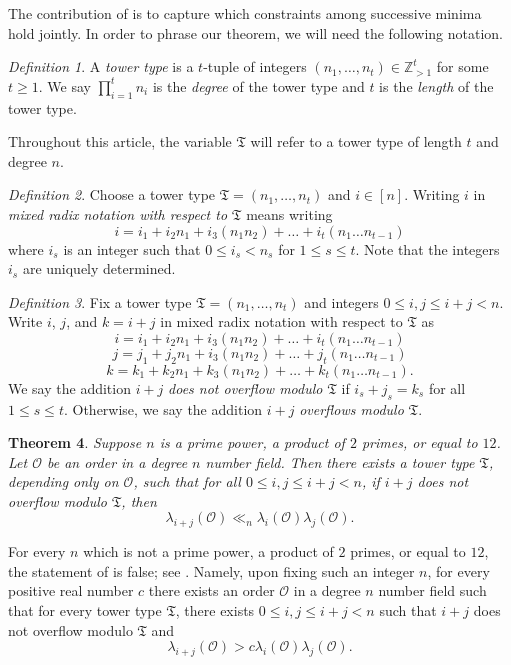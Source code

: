 \documentclass[letterpaper,10pt]{amsart}
\newcommand{\ZZ}{\mathbb{Z}}      %
\newcommand{\cO}{\mathcal{O}}      %
\newcommand{\mfT}{\mathfrak{T}}
\newtheorem{theorem}{Theorem}[section]
\theoremstyle{definition}
\theoremstyle{remark}
\newtheorem{definition}[theorem]{Definition}
\begin{document}
The contribution of  is to capture which constraints among successive minima hold jointly. In order to phrase our theorem, we will need the following notation.

\begin{definition}
\label{def:tower-type}
A \emph{tower type} is a $t$-tuple of integers $(n_1,\dots,n_t) \in \ZZ_{>1}^t$ for some $t \geq 1$. We say $\prod_{i = 1}^tn_i$ is the \emph{degree} of the tower type and $t$ is the \emph{length} of the tower type. 
\end{definition}

\noindent Throughout this article, the variable $\mfT$ will refer to a tower type of length $t$ and degree $n$. 

\begin{definition}
\label{def:mixed-radix}
Choose a tower type $\mfT = (n_1,\dots,n_t)$ and $i \in [n]$. Writing $i$ in \emph{mixed radix notation with respect to $\mfT$} means writing
\[
	i = i_1 + i_2 n_1 + i_3 (n_1n_2) + \dots + i_t(n_1\dots n_{t-1})
\]
where $i_s$ is an integer such that $0 \leq i_s < n_s$ for $1\leq s \leq t$. Note that the integers $i_s$ are uniquely determined.
\end{definition}

\begin{definition}
\label{def:overflow}
Fix a tower type $\mfT=(n_1,\dots,n_t)$ and integers $0 \leq i, j \leq i + j < n$. Write $i$, $j$, and $k=i+j$ in mixed radix notation with respect to $\mfT$ as 
\[
	i = i_1 + i_2 n_1 + i_3 (n_1n_2) + \dots + i_t(n_1\dots n_{t-1})
\]
\[
	j = j_1 + j_2 n_1 + i_3 (n_1n_2) + \dots + j_t(n_1\dots n_{t-1})
\]
\[
	k = k_1 + k_2 n_1 + k_3 (n_1n_2) + \dots + k_t(n_1\dots n_{t-1}).
\]
We say the addition $i+j$ \emph{does not overflow modulo $\mfT$} if $i_s + j_s = k_s$ for all $1 \leq s \leq t$. Otherwise, we say the addition $i+j$ \emph{overflows modulo $\mfT$}.
\end{definition}

\begin{theorem}
\label{thm:containment}
Suppose $n$ is a prime power, a product of $2$ primes, or equal to $12$. Let $\cO$ be an order in a degree $n$ number field. Then there exists a tower type $\mfT$, depending only on $\cO$, such that for all $0 \leq i,j \leq i+j < n$, if $i + j$ does not overflow modulo $\mfT$, then
\[
    \lambda_{i + j}(\cO) \ll_n \lambda_i(\cO) \lambda_j(\cO).
\]
\end{theorem}

For every $n$ which is not a prime power, a product of $2$ primes, or equal to $12$, the statement of  is false; see . Namely, upon fixing such an integer $n$, for every positive real number $c$ there exists an order $\cO$ in a degree $n$ number field such that for every tower type $\mfT$, there exists $0 \leq i,j \leq i+j < n$ such that $i + j$ does not overflow modulo $\mfT$ and 
\[
    \lambda_{i + j}(\cO) > c\lambda_i(\cO) \lambda_j(\cO).
\]
\end{document}
